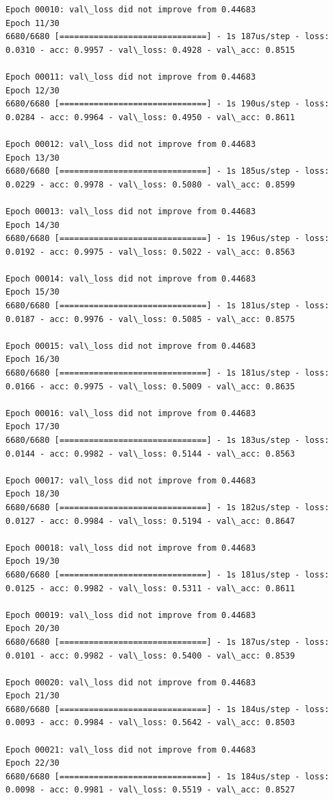 \documentclass[11pt]{article}
\begin{document}
\begin{Verbatim}[commandchars=\\\{\}]
Epoch 00010: val\_loss did not improve from 0.44683
Epoch 11/30
6680/6680 [==============================] - 1s 187us/step - loss: 0.0310 - acc: 0.9957 - val\_loss: 0.4928 - val\_acc: 0.8515

Epoch 00011: val\_loss did not improve from 0.44683
Epoch 12/30
6680/6680 [==============================] - 1s 190us/step - loss: 0.0284 - acc: 0.9964 - val\_loss: 0.4950 - val\_acc: 0.8611

Epoch 00012: val\_loss did not improve from 0.44683
Epoch 13/30
6680/6680 [==============================] - 1s 185us/step - loss: 0.0229 - acc: 0.9978 - val\_loss: 0.5080 - val\_acc: 0.8599

Epoch 00013: val\_loss did not improve from 0.44683
Epoch 14/30
6680/6680 [==============================] - 1s 196us/step - loss: 0.0192 - acc: 0.9975 - val\_loss: 0.5022 - val\_acc: 0.8563

Epoch 00014: val\_loss did not improve from 0.44683
Epoch 15/30
6680/6680 [==============================] - 1s 181us/step - loss: 0.0187 - acc: 0.9976 - val\_loss: 0.5085 - val\_acc: 0.8575

Epoch 00015: val\_loss did not improve from 0.44683
Epoch 16/30
6680/6680 [==============================] - 1s 181us/step - loss: 0.0166 - acc: 0.9975 - val\_loss: 0.5009 - val\_acc: 0.8635

Epoch 00016: val\_loss did not improve from 0.44683
Epoch 17/30
6680/6680 [==============================] - 1s 183us/step - loss: 0.0144 - acc: 0.9982 - val\_loss: 0.5144 - val\_acc: 0.8563

Epoch 00017: val\_loss did not improve from 0.44683
Epoch 18/30
6680/6680 [==============================] - 1s 182us/step - loss: 0.0127 - acc: 0.9984 - val\_loss: 0.5194 - val\_acc: 0.8647

Epoch 00018: val\_loss did not improve from 0.44683
Epoch 19/30
6680/6680 [==============================] - 1s 181us/step - loss: 0.0125 - acc: 0.9982 - val\_loss: 0.5311 - val\_acc: 0.8611

Epoch 00019: val\_loss did not improve from 0.44683
Epoch 20/30
6680/6680 [==============================] - 1s 187us/step - loss: 0.0101 - acc: 0.9982 - val\_loss: 0.5400 - val\_acc: 0.8539

Epoch 00020: val\_loss did not improve from 0.44683
Epoch 21/30
6680/6680 [==============================] - 1s 184us/step - loss: 0.0093 - acc: 0.9984 - val\_loss: 0.5642 - val\_acc: 0.8503

Epoch 00021: val\_loss did not improve from 0.44683
Epoch 22/30
6680/6680 [==============================] - 1s 184us/step - loss: 0.0098 - acc: 0.9981 - val\_loss: 0.5519 - val\_acc: 0.8527


\end{Verbatim}
\end{document}
